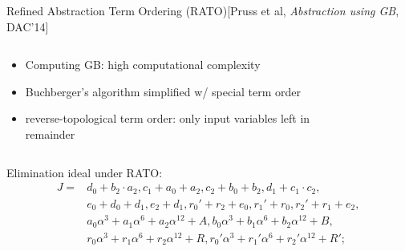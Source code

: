 \documentclass[xcolor=dvipsnames]{beamer}
\newcommand{\bi}{\begin{itemize}}
\newcommand{\ei}{\end{itemize}}
\begin{document}
\begin{frame}{\large{Refined Abstraction Term Ordering (RATO)[Pruss et al, {\it Abstraction using GB}, DAC'14]}}
\vspace{-0.2in}
\begin{columns}
\begin{column}{0.5\textwidth}
\bi
\item Computing GB: high computational complexity
\item Buchberger's algorithm simplified w/ special term order
	\item reverse-topological term order: \alert{only input variables left in remainder}

\ei
\end{column}
\begin{column}{0.5\textwidth}
\begin{figure}[hbt]
\end{figure}
\end{column}
\end{columns}
\begin{Example} 
Elimination ideal under RATO:
\vspace{-0.1in}
\begin{align*}
J = &d_0+b_2\cdot a_2,
c_1+a_0+a_2,
c_2+b_0+b_2,
d_1+c_1\cdot c_2,\\
&e_0+d_0+d_1,
e_2+d_1,
r_0'+r_2+e_0,
r_1'+r_0,
r_2'+r_1+e_2,\\
&a_0\alpha^3+a_1\alpha^6+a_2\alpha^{12}+A,
b_0\alpha^3+b_1\alpha^6+b_2\alpha^{12}+B,\\
&r_0\alpha^3+r_1\alpha^6+r_2\alpha^{12}+R,
r_0'\alpha^3+r_1'\alpha^6+r_2'\alpha^{12}+R';
\end{align*}
\end{Example}
\end{frame}
\end{document}
